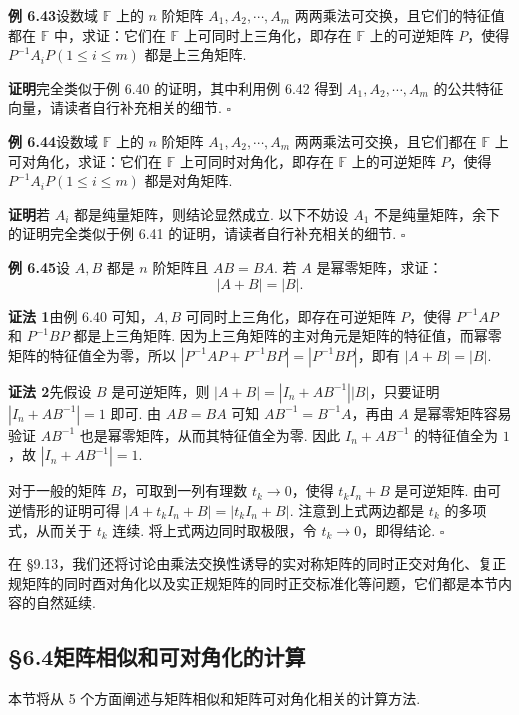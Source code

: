 \documentclass[UTF8,12pt,a4paper,fontset=fandol]{ctexart}
\begin{document}
\noindent\textbf{例 6.43}\quad 设数域 $\mathbb{F}$ 上的 $n$ 阶矩阵 $A_1,A_2,\cdots,A_m$ 两两乘法可交换，且它们的特征值都在 $\mathbb{F}$ 中，求证：它们在 $\mathbb{F}$ 上可同时上三角化，即存在 $\mathbb{F}$ 上的可逆矩阵 $P$，使得 $P^{-1}A_iP(1\le i\le m)$ 都是上三角矩阵.

\noindent\textbf{证明}\quad 完全类似于例 6.40 的证明，其中利用例 6.42 得到 $A_1,A_2,\cdots,A_m$ 的公共特征向量，请读者自行补充相关的细节. $\square$

\noindent\textbf{例 6.44}\quad 设数域 $\mathbb{F}$ 上的 $n$ 阶矩阵 $A_1,A_2,\cdots,A_m$ 两两乘法可交换，且它们都在 $\mathbb{F}$ 上可对角化，求证：它们在 $\mathbb{F}$ 上可同时对角化，即存在 $\mathbb{F}$ 上的可逆矩阵 $P$，使得 $P^{-1}A_iP(1\le i\le m)$ 都是对角矩阵.

\noindent\textbf{证明}\quad 若 $A_i$ 都是纯量矩阵，则结论显然成立. 以下不妨设 $A_1$ 不是纯量矩阵，余下的证明完全类似于例 6.41 的证明，请读者自行补充相关的细节. $\square$

\noindent\textbf{例 6.45}\quad 设 $A,B$ 都是 $n$ 阶矩阵且 $AB=BA$. 若 $A$ 是幂零矩阵，求证：
\[
|A+B|=|B|.
\]

\noindent\textbf{证法 1}\quad 由例 6.40 可知，$A,B$ 可同时上三角化，即存在可逆矩阵 $P$，使得 $P^{-1}AP$ 和 $P^{-1}BP$ 都是上三角矩阵. 因为上三角矩阵的主对角元是矩阵的特征值，而幂零矩阵的特征值全为零，所以 $|P^{-1}AP+P^{-1}BP|=|P^{-1}BP|$，即有 $|A+B|=|B|$.

\noindent\textbf{证法 2}\quad 先假设 $B$ 是可逆矩阵，则 $|A+B|=|I_n+AB^{-1}||B|$，只要证明 $|I_n+AB^{-1}|=1$ 即可. 由 $AB=BA$ 可知 $AB^{-1}=B^{-1}A$，再由 $A$ 是幂零矩阵容易验证 $AB^{-1}$ 也是幂零矩阵，从而其特征值全为零. 因此 $I_n+AB^{-1}$ 的特征值全为 $1$，故 $|I_n+AB^{-1}|=1$.

对于一般的矩阵 $B$，可取到一列有理数 $t_k\to 0$，使得 $t_kI_n+B$ 是可逆矩阵. 由可逆情形的证明可得 $|A+t_kI_n+B|=|t_kI_n+B|$. 注意到上式两边都是 $t_k$ 的多项式，从而关于 $t_k$ 连续. 将上式两边同时取极限，令 $t_k\to 0$，即得结论. $\square$

在 §9.13，我们还将讨论由乘法交换性诱导的实对称矩阵的同时正交对角化、复正规矩阵的同时酉对角化以及实正规矩阵的同时正交标准化等问题，它们都是本节内容的自然延续.

\subsection*{§6.4\quad 矩阵相似和可对角化的计算}

本节将从 5 个方面阐述与矩阵相似和矩阵可对角化相关的计算方法.
\end{document}
